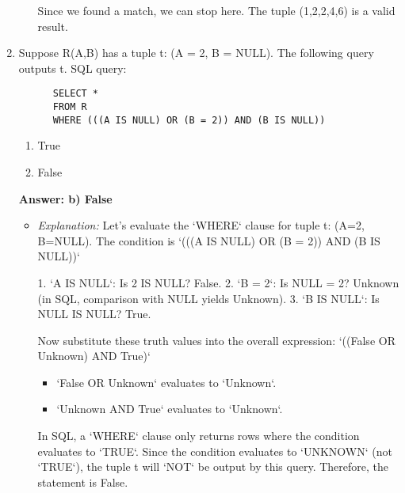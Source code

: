 \documentclass{article}
\begin{document}
\begin{enumerate}[label=\textbf{Question \arabic*.}]
\begin{itemize}
        Since we found a match, we can stop here. The tuple (1,2,2,4,6) is a valid result.
    \end{itemize}

\item Suppose R(A,B) has a tuple t: (A = 2, B = NULL).
    The following query outputs t.
    SQL query:
    \begin{lstlisting}
      SELECT *
      FROM R
      WHERE (((A IS NULL) OR (B = 2)) AND (B IS NULL))
    \end{lstlisting}
    \begin{enumerate}[label=\alph*)]
        \item True
        \item False
    \end{enumerate}
    \textbf{Answer: b) False}
    \begin{itemize}
        \item \textit{Explanation:} Let's evaluate the `WHERE` clause for tuple t: (A=2, B=NULL).
        The condition is `(((A IS NULL) OR (B = 2)) AND (B IS NULL))`

        1.  `A IS NULL`: Is 2 IS NULL? False.
        2.  `B = 2`: Is NULL = 2? Unknown (in SQL, comparison with NULL yields Unknown).
        3.  `B IS NULL`: Is NULL IS NULL? True.

        Now substitute these truth values into the overall expression:
        `((False OR Unknown) AND True)`

        \begin{itemize}
            \item `False OR Unknown` evaluates to `Unknown`.
            \item `Unknown AND True` evaluates to `Unknown`.
        \end{itemize}
        In SQL, a `WHERE` clause only returns rows where the condition evaluates to `TRUE`. Since the condition evaluates to `UNKNOWN` (not `TRUE`), the tuple t will `NOT` be output by this query. Therefore, the statement is False.
    \end{itemize}


\end{enumerate}
\end{document}
